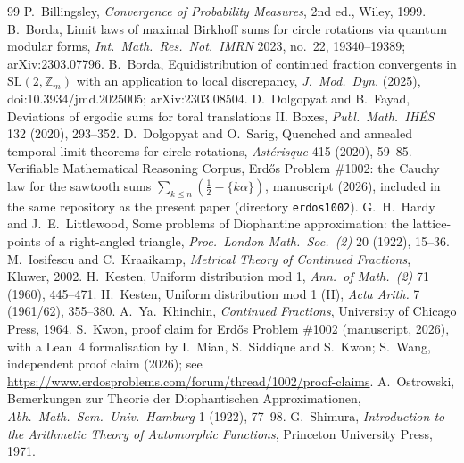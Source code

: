 \documentclass[11pt]{amsart}
\theoremstyle{definition}
\numberwithin{equation}{section}
\newcommand{\Z}{\mathbb{Z}}
\begin{document}
\begin{thebibliography}{99}
 P.~Billingsley, \emph{Convergence of Probability Measures}, 2nd ed., Wiley, 1999.
 B.~Borda, Limit laws of maximal Birkhoff sums for circle rotations via quantum modular forms, \emph{Int.\ Math.\ Res.\ Not.\ IMRN} 2023, no.~22, 19340--19389; arXiv:2303.07796.
 B.~Borda, Equidistribution of continued fraction convergents in $\mathrm{SL}(2,\Z_m)$ with an application to local discrepancy, \emph{J.\ Mod.\ Dyn.} (2025), doi:10.3934/jmd.2025005; arXiv:2303.08504.
 D.~Dolgopyat and B.~Fayad, Deviations of ergodic sums for toral translations II. Boxes, \emph{Publ.\ Math.\ IH\'ES} 132 (2020), 293--352.
 D.~Dolgopyat and O.~Sarig, Quenched and annealed temporal limit theorems for circle rotations, \emph{Ast\'erisque} 415 (2020), 59--85.
 Verifiable Mathematical Reasoning Corpus, Erd\H{o}s Problem \#1002: the Cauchy law for the sawtooth sums $\sum_{k\le n}(\frac12-\{k\alpha\})$, manuscript (2026), included in the same repository as the present paper (directory \texttt{erdos1002}).
 G.~H.~Hardy and J.~E.~Littlewood, Some problems of Diophantine approximation: the lattice-points of a right-angled triangle, \emph{Proc.\ London Math.\ Soc.\ (2)} 20 (1922), 15--36.
 M.~Iosifescu and C.~Kraaikamp, \emph{Metrical Theory of Continued Fractions}, Kluwer, 2002.
 H.~Kesten, Uniform distribution mod 1, \emph{Ann.\ of Math.\ (2)} 71 (1960), 445--471.
 H.~Kesten, Uniform distribution mod 1 (II), \emph{Acta Arith.} 7 (1961/62), 355--380.
 A.~Ya.~Khinchin, \emph{Continued Fractions}, University of Chicago Press, 1964.
 S.~Kwon, proof claim for Erd\H{o}s Problem \#1002 (manuscript, 2026), with a Lean~4 formalisation by I.~Mian, S.~Siddique and S.~Kwon; S.~Wang, independent proof claim (2026); see \url{https://www.erdosproblems.com/forum/thread/1002/proof-claims}.
 A.~Ostrowski, Bemerkungen zur Theorie der Diophantischen Approximationen, \emph{Abh.\ Math.\ Sem.\ Univ.\ Hamburg} 1 (1922), 77--98.
 G.~Shimura, \emph{Introduction to the Arithmetic Theory of Automorphic Functions}, Princeton University Press, 1971.
\end{thebibliography}
\end{document}
